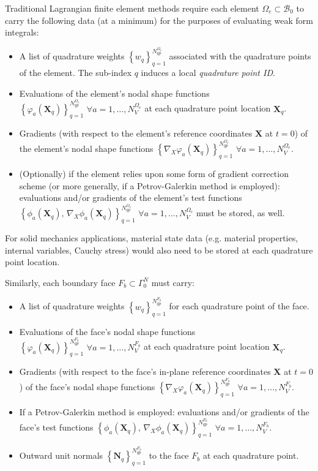	Traditional Lagrangian finite element methods require each element $\Omega_e \subset \mathcal{B}_0$ to carry the following data (at a minimum) for the purposes of evaluating weak form integrals:
	\begin{itemize}
		\item A list of quadrature weights $\left\{ w_q \right\}_{q=1}^{N^{\Omega_e}_{qp}}$ associated with the quadrature points of the element. The sub-index $q$ induces a local \textit{quadrature point ID}.
		\item Evaluations of the element's nodal shape functions $\left\{ \varphi_a (\mathbf{X}_q) \right\}_{q=1}^{N^{\Omega_e}_{qp}} \, \, \forall a = 1, \ldots, N^{\Omega_e}_V$ at each quadrature point location $\mathbf{X}_q$.
		\item Gradients (with respect to the element's reference coordinates $\mathbf{X}$ at $t = 0$) of the element's nodal shape functions $\left\{ \nabla_X \varphi_a (\mathbf{X}_q) \right\}_{q=1}^{N^{\Omega_e}_{qp}} \, \, \forall a = 1, \ldots, N^{\Omega_e}_V$.
		\item (Optionally) if the element relies upon some form of gradient correction scheme (or more generally, if a Petrov-Galerkin method is employed): evaluations and/or gradients of the element's test functions $\left\{ \phi_a (\mathbf{X}_q), \, \nabla_X \phi_a (\mathbf{X}_q) \right\}_{q=1}^{N^{\Omega_e}_{qp}} \, \, \forall a = 1, \ldots, N^{\Omega_e}_V$ must be stored, as well.
	\end{itemize}
	For solid mechanics applications, material state data (e.g. material properties, internal variables, Cauchy stress) would also need to be stored at each quadrature point location.
	
	Similarly, each boundary face $F_b \subset \Gamma^N_0$ must carry:
	\begin{itemize}
		\item A list of quadrature weights $\left\{ w_q \right\}_{q=1}^{N^{F_b}_{qp}}$ for each quadrature point of the face.
		\item Evaluations of the face's nodal shape functions $\left\{ \varphi_a (\mathbf{X}_q) \right\}_{q=1}^{N^{F_b}_{qp}} \, \, \forall a = 1, \ldots, N^{F_b}_V$ at each quadrature point location $\mathbf{X}_q$.
		\item Gradients (with respect to the face's in-plane reference coordinates $\mathbf{X}$ at $t = 0$) of the face's nodal shape functions $\left\{ \nabla_X \varphi_a (\mathbf{X}_q) \right\}_{q=1}^{N^{F_b}_{qp}} \, \, \forall a = 1, \ldots, N^{F_b}_V$.
		\item If a Petrov-Galerkin method is employed: evaluations and/or gradients of the face's test functions $\left\{ \phi_a (\mathbf{X}_q), \, \nabla_X \phi_a (\mathbf{X}_q) \right\}_{q=1}^{N^{F_b}_{qp}} \, \, \forall a = 1, \ldots, N^{F_b}_V$.
		\item Outward unit normals $\left\{ \mathbf{N}_q \right\}_{q=1}^{N^{F_b}_{qp}}$ to the face $F_b$ at each quadrature point.
	\end{itemize}
	
